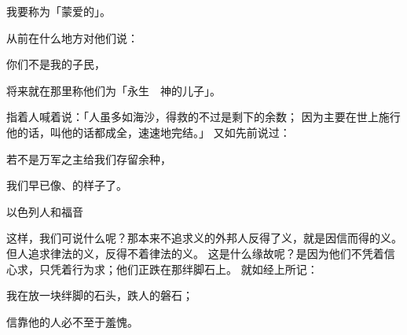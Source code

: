 {\par }{\Q 我要称为「蒙爱的」。
\par }{\Q {}从前在什么地方对他们说：
\par }{\Q 你们不是我的子民，
\par }{\Q 将来就在那里称他们为「永生　神的儿子」。
\par }{\PP {}指着{}人喊着说：「{}人虽多如海沙，得救的不过是剩下的余数；
因为主要在世上施行他的话，叫他的话都成全，速速地完结。」
又如{}先前说过：
\par }{\Q 若不是万军之主给我们存留余种，
\par }{\Q 我们早已像{}、{}的样子了。
\par }{\SH 以色列人和福音
\par }{\PP {}这样，我们可说什么呢？那本来不追求义的外邦人反得了义，就是因信而得的义。
但{}人追求律法的义，反得不着律法的义。
这是什么缘故呢？是因为他们不凭着信心求，只凭着行为求；他们正跌在那绊脚石上。
就如经上所记：
\par }{\Q 我在{}放一块绊脚的石头，跌人的磐石；
\par }{\Q 信靠他的人必不至于羞愧。

}
